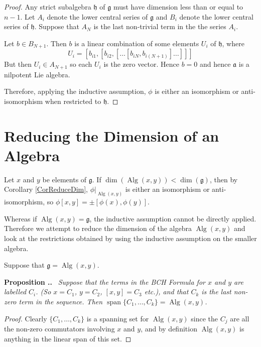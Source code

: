 \documentclass[honours]{UNSWthesis}
\newcommand{\g}{\mathfrak{g}}
\newcommand{\1}{\mathbf{e}_{1}}
\newcommand{\2}{\mathbf{e}_{3}}
\newcommand{\3}{\mathbf{e}_{3}}
\DeclareMathOperator{\alg}{Alg}
\DeclareMathOperator{\spn}{span}
\newcounter{Item}[section]
\newenvironment{Proposition}{\medskip
                            \refstepcounter{Item}
                            \noindent
                           {\bf Proposition \thesection.\theItem.}\ %
                            \begingroup \sl}
                           {\endgroup\medskip}
\begin{document}
\begin{proof}
Any strict subalgebra $\mathfrak{h}$ of $\g$ must have dimension less than or equal to $n-1$. Let $A_{i}$ denote the lower central series of $\g$ and $B_{i}$ denote the lower central series of $\mathfrak{h}$. Suppose that $A_{N}$ is the last non-trivial term in the the series $A_{i}$. 

Let $b \in B_{N+1}$. Then $b$ is a linear combination of some elements $U_{i}$ of $\mathfrak{h}$, where 
\[
U_{i}=[b_{i1},[b_{i2},[\ldots[b_{iN}, b_{i(N+1)}]\ldots]]]
\]
But then $U_{i} \in A_{N+1}$ so each $U_{i}$ is the zero vector. Hence $b=0$ and hence $\mathfrak{a}$ is a nilpotent Lie algebra. 

Therefore, applying the inductive assumption, $\phi$ is either an isomorphism or anti-isomorphism when restricted to $\mathfrak{h}$.
  
\end{proof}

\section{Reducing the Dimension of an Algebra}
Let $x$ and $y$ be elements of $\g$. If $\dim(\alg(x,y)) < \dim(\g)$, then by Corollary \ref{CorReduceDim}, \; $\phi|_{\alg(x,y)}$ is either an isomorphism or anti-isomorphism, so $\phi[x,y]= \pm [\phi(x),\phi(y)]$. 

Whereas if $\alg(x,y)=\g$, the inductive assumption cannot be directly applied. Therefore we attempt to reduce the dimension of the algebra $\alg(x,y)$ and look at the restrictions obtained by using the inductive assumption on the smaller algebra. \newline 

Suppose that $\g=\alg(x,y)$.

\begin{Proposition}
Suppose that the terms in the BCH Formula for $x$ and $y$ are labelled $C_{i}$. (So $x=C_{1}$, $y=C_{2}$, $[x,y]=C_{3}$ etc.), and that $C_{k}$ is the last non-zero term in the sequence. 
Then $\spn\{C_{1},\ldots,C_{k}\}=\alg(x,y)$.

\end{Proposition}

\begin{proof}

Clearly $\{ C_{1},\ldots,C_{k} \}$ is a spanning set for $\alg(x,y)$ since the $C_{j}$ are all the non-zero commutators involving $x$ and $y$, and by definition $\alg(x,y)$ is anything in the linear span of this set.

\end{proof}
\end{document}
